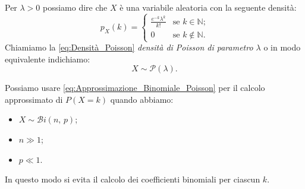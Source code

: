\begin{defn}
                Per $\lambda > 0$ possiamo dire che $X$ è una variabile aleatoria con la seguente densità:
                \begin{equation}\label{eq:Densità_Poisson}
                    p_X(k) = \begin{cases}
                        \frac{e^{-k}\lambda^k}{k!} & \text{se $k \in \mathbb{N}$;} \\
                        0 & \text{se $k \notin \mathbb{N}$.}
                    \end{cases}
                \end{equation}
                Chiamiamo la \eqref{eq:Densità_Poisson} \textit{densità di Poisson di parametro $\lambda$} o in modo equivalente indichiamo: \[
                    X \sim \mathcal{P}(\lambda)
                .\] 
            \end{defn}
            \begin{obsv}
                Possiamo usare \eqref{eq:Approssimazione_Binomiale_Poisson} per il calcolo approssimato di $P(X = k)$ quando abbiamo:
                \begin{itemize}
                    \item $X \sim \mathcal{B}i(n,\,p)$;
                    \item $n \gg 1$;
                    \item $p \ll 1$.
                \end{itemize}
                In questo modo si evita il calcolo dei coefficienti binomiali per ciascun $k$.
            \end{obsv}
